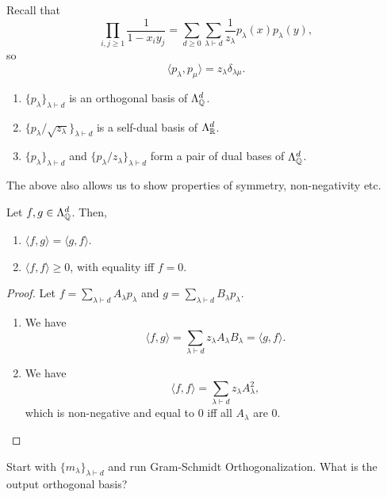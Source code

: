 	Recall that
	\[ \prod_{i,j \ge 1} \frac{1}{1-x_iy_j} = \sum_{d \ge 0} \sum_{\lambda \vdash d} \frac{1}{z_\lambda} p_\lambda(x) p_\lambda(y), \]
	so
	\[ \langle  p_\lambda , p_\mu \rangle = z_\lambda \delta_{\lambda\mu}. \]

	\begin{fcor}
		\phantom{pain}
		\begin{enumerate}
			\item $\{ p_\lambda \}_{\lambda \vdash d}$ is an orthogonal basis of $\Lambda_{\mathbb{Q}}^d$.
			\item $\{ p_\lambda/\sqrt{z_\lambda} \}_{\lambda \vdash d}$ is a self-dual basis of $\Lambda_{\mathbb{R}}^d$.
			\item $\{ p_\lambda \}_{\lambda \vdash d}$ and $\{p_\lambda/z_\lambda\}_{\lambda\vdash d}$ form a pair of dual bases of $\Lambda_{\mathbb{Q}}^d$.
		\end{enumerate}
	\end{fcor}

	The above also allows us to show properties of symmetry, non-negativity etc.

	\begin{fcor}
		Let $f,g \in \Lambda_{\mathbb{Q}}^d$. Then,
		\begin{enumerate}
			\item $\langle f,g\rangle = \langle g,f\rangle$.
			\item $\langle f,f\rangle \ge 0$, with equality iff $f = 0$.
		\end{enumerate}
	\end{fcor}
	\begin{proof}
		Let $f = \sum_{\lambda \vdash d} A_\lambda p_\lambda$ and $g = \sum_{\lambda \vdash d} B_\lambda p_\lambda$. 
		\begin{enumerate}
			\item We have
			\[ \langle f,g \rangle = \sum_{\lambda \vdash d} z_\lambda A_\lambda B_\lambda = \langle g,f\rangle. \]
			\item We have
			\[ \langle f,f\rangle = \sum_{\lambda \vdash d} z_\lambda A_\lambda^2, \]
			which is non-negative and equal to $0$ iff all $A_\lambda$ are $0$. \qedhere
		\end{enumerate}
	\end{proof}

	\begin{exercise}
		Start with $\{m_\lambda\}_{\lambda\vdash d}$ and run Gram-Schmidt Orthogonalization. What is the output orthogonal basis?
	\end{exercise}

